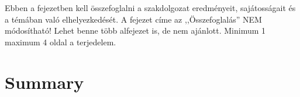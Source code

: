 
\label{Chap:osszefoglalas}

Ebben a fejezetben kell összefoglalni a szakdolgozat eredményeit, sajátosságait és a témában való elhelyezkedését. A fejezet címe az ,,Összefoglalás'' NEM módosítható! Lehet benne több alfejezet is, de nem ajánlott. Minimum 1 maximum 4 oldal a terjedelem. 

\pagestyle{empty}
\newpage

\section*{Summary}

